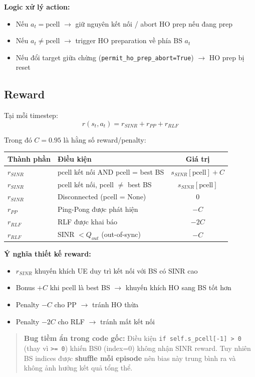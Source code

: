 \documentclass[11pt]{article}
\begin{document}
\textbf{Logic xử lý action:}
\begin{itemize}
  \item Nếu $a_t = \text{pcell}$ $\rightarrow$ giữ nguyên kết nối / abort HO prep nếu đang prep
  \item Nếu $a_t \neq \text{pcell}$ $\rightarrow$ trigger HO preparation về phía BS $a_t$
  \item Nếu đổi target giữa chừng (\texttt{permit\_ho\_prep\_abort=True}) $\rightarrow$ HO prep bị reset
\end{itemize}

\subsection{Reward}

Tại mỗi timestep:
\[
r(s_t, a_t) = r_{SINR} + r_{PP} + r_{RLF}
\]

Trong đó $C = 0.95$ là hằng số reward/penalty:

\begin{longtable}{@{}lp{6.5cm}c@{}}
\toprule
\textbf{Thành phần} & \textbf{Điều kiện} & \textbf{Giá trị} \\
\midrule
\endhead
$r_{SINR}$ & pcell kết nối AND pcell = best BS & $s_{SINR}[\text{pcell}] + C$ \\
$r_{SINR}$ & pcell kết nối, pcell $\neq$ best BS & $s_{SINR}[\text{pcell}]$ \\
$r_{SINR}$ & Disconnected (pcell = None) & $0$ \\
$r_{PP}$ & Ping-Pong được phát hiện & $-C$ \\
$r_{RLF}$ & RLF được khai báo & $-2C$ \\
$r_{RLF}$ & SINR $< Q_{out}$ (out-of-sync) & $-C$ \\
\bottomrule
\end{longtable}

\textbf{Ý nghĩa thiết kế reward:}
\begin{itemize}
  \item $r_{SINR}$ khuyến khích UE duy trì kết nối với BS có SINR cao
  \item Bonus $+C$ khi pcell là best BS $\rightarrow$ khuyến khích HO sang BS tốt hơn
  \item Penalty $-C$ cho PP $\rightarrow$ tránh HO thừa
  \item Penalty $-2C$ cho RLF $\rightarrow$ tránh mất kết nối
\end{itemize}

\begin{quote}
\textbf{Bug tiềm ẩn trong code gốc:} Điều kiện \texttt{if self.s\_pcell[-1] > 0} (thay vì \texttt{>= 0}) khiến BS0 (index=0) không nhận SINR reward. Tuy nhiên BS indices được \textbf{shuffle mỗi episode} nên bias này trung bình ra và không ảnh hưởng kết quả tổng thể.
\end{quote}
\end{document}
